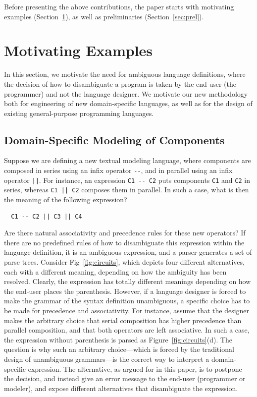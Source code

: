 \documentclass[runningheads]{llncs}
\begin{document}
\noindent Before presenting the above contributions, the paper starts with motivating examples (Section~\ref{sec:motivation}), as well as preliminaries (Section~\ref{sec:prel}).




\section{Motivating Examples}
\label{sec:motivation}
In this section, we motivate the need for ambiguous language definitions, where the decision of how to disambiguate a program is taken by the end-user (the programmer) and not the language designer. We motivate our new methodology both for engineering of new domain-specific languages, as well as for the design of existing general-purpose programming languages.

\subsection{Domain-Specific Modeling of Components}
Suppose we are defining a new textual modeling language, where components are composed in series using an infix operator \verb~--~, and in parallel using an infix operator \verb~||~. For instance, an expression \verb~C1 -- C2~ puts components \verb~C1~ and \verb~C2~ in series, whereas \verb~C1 || C2~ composes them in parallel. In such a case, what is then the meaning of the following expression?
\begin{verbatim}
  C1 -- C2 || C3 || C4
\end{verbatim}

\noindent Are there natural associativity and precedence rules for these new operators? If there are no predefined rules of how to disambiguate this expression within the language definition, it is an ambiguous expression, and a parser generates a set of parse trees. Consider Fig~\ref{fig:circuits}, which depicts four different alternatives, each with a different meaning, depending on how the ambiguity has been resolved. Clearly, the expression has totally different meanings depending on how the end-user places the parenthesis. However, if a language designer is forced to make the grammar of the syntax definition unambiguous, a specific choice has to be made for precedence and associativity. For instance, assume that the designer makes the arbitrary choice that serial composition has higher precedence than parallel composition, and that both operators are left associative. In such a case, the expression without parenthesis is parsed as Figure~\ref{fig:circuits}(d). The question is why such an arbitrary choice---which is forced by the traditional design of unambiguous grammars---is the correct way to interpret a domain-specific expression. The alternative, as argued for in this paper, is to postpone the decision, and instead give an error message to the end-user (programmer or modeler), and expose different alternatives that disambiguate the expression.
\end{document}
